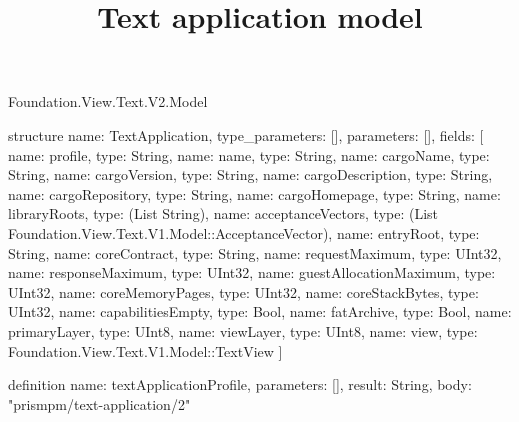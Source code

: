 \begin{lexlean}{Foundation.View.Text.V2.Model}
\title{Text application model}
\begin{semanticmodule}
structure{
  name: TextApplication,
  type_parameters: [],
  parameters: [],
  fields: [
    {name: profile, type: String},
    {name: name, type: String},
    {name: cargoName, type: String},
    {name: cargoVersion, type: String},
    {name: cargoDescription, type: String},
    {name: cargoRepository, type: String},
    {name: cargoHomepage, type: String},
    {name: libraryRoots, type: (List String)},
    {name: acceptanceVectors, type: (List Foundation.View.Text.V1.Model::AcceptanceVector)},
    {name: entryRoot, type: String},
    {name: coreContract, type: String},
    {name: requestMaximum, type: UInt32},
    {name: responseMaximum, type: UInt32},
    {name: guestAllocationMaximum, type: UInt32},
    {name: coreMemoryPages, type: UInt32},
    {name: coreStackBytes, type: UInt32},
    {name: capabilitiesEmpty, type: Bool},
    {name: fatArchive, type: Bool},
    {name: primaryLayer, type: UInt8},
    {name: viewLayer, type: UInt8},
    {name: view, type: Foundation.View.Text.V1.Model::TextView}
  ]
}

definition{
  name: textApplicationProfile,
  parameters: [],
  result: String,
  body: "prismpm/text-application/2"
}
\end{semanticmodule}
\end{lexlean}
